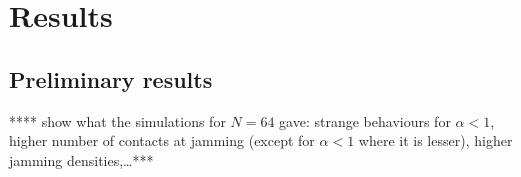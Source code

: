 \documentclass[class=report, float=false, crop=false]{standalone}
\begin{document}
\chapter{Results}
\label{chap:results}

\section{Preliminary results}

**** show what the simulations for $N=64$ gave: strange behaviours for $\alpha<1$, higher number of contacts at jamming (except for $\alpha<1$ where it is lesser), higher jamming densities,\ldots ****

% 
\end{document}
